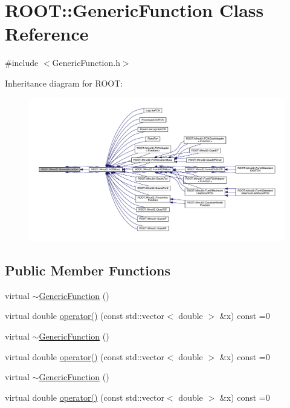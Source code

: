 \hypertarget{classROOT_1_1Minuit2_1_1GenericFunction}{}\section{R\+O\+OT\+:\+:Generic\+Function Class Reference}
\label{classROOT_1_1Minuit2_1_1GenericFunction}


{\ttfamily \#include $<$Generic\+Function.\+h$>$}



Inheritance diagram for R\+O\+OT\+:
\nopagebreak
\begin{figure}[H]
\begin{center}
\leavevmode
\includegraphics[width=350pt]{de/d50/classROOT_1_1Minuit2_1_1GenericFunction__inherit__graph}
\end{center}
\end{figure}
\subsection*{Public Member Functions}
\begin{DoxyCompactItemize}
\item 
virtual \mbox{\hyperlink{classROOT_1_1Minuit2_1_1GenericFunction_ac1d198b822e43d3936286cc580c3e035}{$\sim$\+Generic\+Function}} ()
\item 
virtual double \mbox{\hyperlink{classROOT_1_1Minuit2_1_1GenericFunction_a0d6039ad9aa18e475534d1fd80342e9d}{operator()}} (const std\+::vector$<$ double $>$ \&x) const =0
\item 
virtual \mbox{\hyperlink{classROOT_1_1Minuit2_1_1GenericFunction_ac1d198b822e43d3936286cc580c3e035}{$\sim$\+Generic\+Function}} ()
\item 
virtual double \mbox{\hyperlink{classROOT_1_1Minuit2_1_1GenericFunction_a0d6039ad9aa18e475534d1fd80342e9d}{operator()}} (const std\+::vector$<$ double $>$ \&x) const =0
\item 
virtual \mbox{\hyperlink{classROOT_1_1Minuit2_1_1GenericFunction_ac1d198b822e43d3936286cc580c3e035}{$\sim$\+Generic\+Function}} ()
\item 
virtual double \mbox{\hyperlink{classROOT_1_1Minuit2_1_1GenericFunction_a0d6039ad9aa18e475534d1fd80342e9d}{operator()}} (const std\+::vector$<$ double $>$ \&x) const =0
\end{DoxyCompactItemize}


